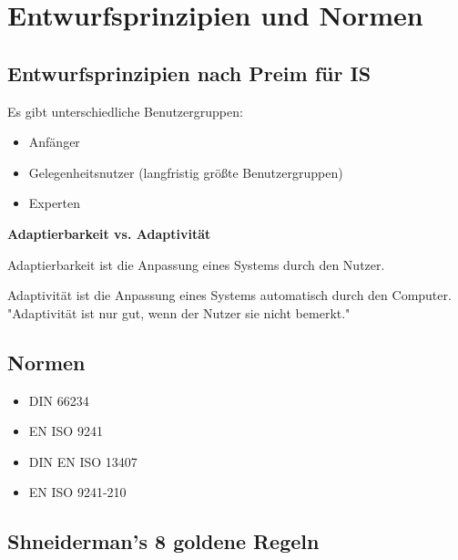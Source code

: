 \documentclass[a4paper]{article}
\title{\docTitle}
\author{Moritz}
\date{\today}
\begin{document}
\maketitle
\tableofcontents


\section{Entwurfsprinzipien und Normen}

\subsection{Entwurfsprinzipien nach Preim für IS}


Es gibt unterschiedliche Benutzergruppen:

\begin{itemize}
    \item Anfänger
    \item Gelegenheitsnutzer (langfristig größte Benutzergruppen)
    \item Experten
\end{itemize}

\textbf{Adaptierbarkeit vs. Adaptivität}

Adaptierbarkeit ist die Anpassung eines Systems durch den Nutzer.

Adaptivität ist die Anpassung eines Systems automatisch durch den Computer. "Adaptivität ist nur gut, wenn der Nutzer sie nicht bemerkt."

\subsection{Normen}


\begin{itemize}
    \item DIN 66234
    \item EN ISO 9241
    \item DIN EN ISO 13407
    \item EN ISO 9241-210
\end{itemize}

\subsection{Shneiderman's 8 goldene Regeln}
\end{document}
